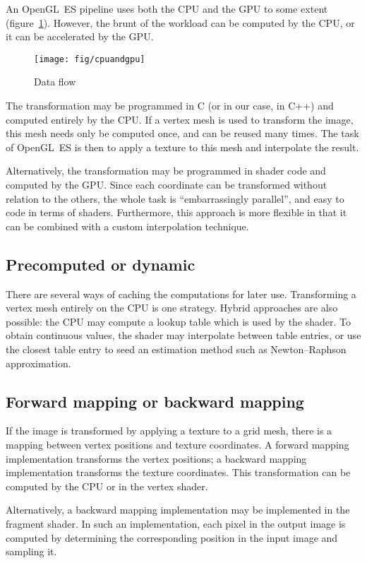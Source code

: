 \documentclass[english,12pt]{ifimaster}
\begin{document}
An OpenGL~ES pipeline uses both the CPU and the GPU to some extent
(figure~\ref{fig:flow}). However, the brunt of the workload can be
computed by the CPU, or it can be accelerated by the GPU.

\begin{figure}
  \centering
  \texttt{[image: fig/cpuandgpu]}
  \caption{Data flow}
  \label{fig:flow}
\end{figure}

The transformation may be programmed in C (or in our case, in C++) and
computed entirely by the CPU. If a vertex mesh is used to transform
the image, this mesh needs only be computed once, and can be reused
many times. The task of OpenGL~ES is then to apply a texture to this
mesh and interpolate the result.

Alternatively, the transformation may be programmed in shader code and
computed by the GPU. Since each coordinate can be transformed without
relation to the others, the whole task is ``embarrassingly parallel'',
and easy to code in terms of shaders. Furthermore, this approach is
more flexible in that it can be combined with a custom interpolation
technique.

\subsection{Precomputed or dynamic}

There are several ways of caching the computations for later use.
Transforming a vertex mesh entirely on the CPU is one strategy. Hybrid
approaches are also possible: the CPU may compute a lookup table which
is used by the shader. To obtain continuous values, the shader may
interpolate between table entries, or use the closest table entry to
seed an estimation method such as Newton--Raphson approximation.

\subsection{Forward mapping or backward mapping}

If the image is transformed by applying a texture to a grid mesh,
there is a mapping between vertex positions and texture coordinates. A
forward mapping implementation transforms the vertex positions; a
backward mapping implementation transforms the texture coordinates.
This transformation can be computed by the CPU or in the vertex
shader.

Alternatively, a backward mapping implementation may be implemented in
the fragment shader. In such an implementation, each pixel in the
output image is computed by determining the corresponding position in
the input image and sampling it.
\end{document}
